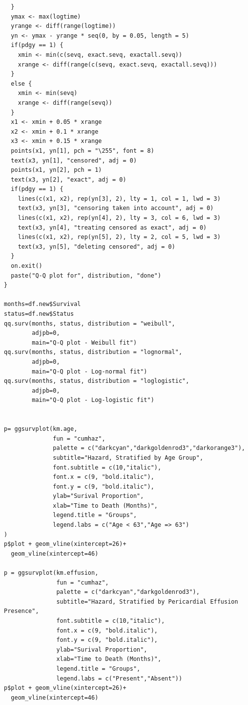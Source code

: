 \documentclass[
]{article}
\begin{document}
\begin{verbatim}
  }
  ymax <- max(logtime)
  yrange <- diff(range(logtime))
  yn <- ymax - yrange * seq(0, by = 0.05, length = 5)
  if(pdgy == 1) {
    xmin <- min(c(sevq, exact.sevq, exactall.sevq))
    xrange <- diff(range(c(sevq, exact.sevq, exactall.sevq)))
  }
  else {
    xmin <- min(sevq)
    xrange <- diff(range(sevq))
  }
  x1 <- xmin + 0.05 * xrange
  x2 <- xmin + 0.1 * xrange
  x3 <- xmin + 0.15 * xrange
  points(x1, yn[1], pch = "\255", font = 8)
  text(x3, yn[1], "censored", adj = 0)
  points(x1, yn[2], pch = 1)
  text(x3, yn[2], "exact", adj = 0)
  if(pdgy == 1) {
    lines(c(x1, x2), rep(yn[3], 2), lty = 1, col = 1, lwd = 3)
    text(x3, yn[3], "censoring taken into account", adj = 0)
    lines(c(x1, x2), rep(yn[4], 2), lty = 3, col = 6, lwd = 3)
    text(x3, yn[4], "treating censored as exact", adj = 0)
    lines(c(x1, x2), rep(yn[5], 2), lty = 2, col = 5, lwd = 3)
    text(x3, yn[5], "deleting censored", adj = 0)
  }
  on.exit()
  paste("Q-Q plot for", distribution, "done")
}

months=df.new$Survival
status=df.new$Status
qq.surv(months, status, distribution = "weibull",
        adjpb=0,
        main="Q-Q plot - Weibull fit")
qq.surv(months, status, distribution = "lognormal",
        adjpb=0,
        main="Q-Q plot - Log-normal fit")
qq.surv(months, status, distribution = "loglogistic",
        adjpb=0,
        main="Q-Q plot - Log-logistic fit")


p= ggsurvplot(km.age, 
              fun = "cumhaz",
              palette = c("darkcyan","darkgoldenrod3","darkorange3"), 
              subtitle="Hazard, Stratified by Age Group",
              font.subtitle = c(10,"italic"),
              font.x = c(9, "bold.italic"),
              font.y = c(9, "bold.italic"),
              ylab="Surival Proportion", 
              xlab="Time to Death (Months)",
              legend.title = "Groups",
              legend.labs = c("Age < 63","Age => 63")
)
p$plot + geom_vline(xintercept=26)+
  geom_vline(xintercept=46)

p = ggsurvplot(km.effusion, 
               fun = "cumhaz",
               palette = c("darkcyan","darkgoldenrod3"), 
               subtitle="Hazard, Stratified by Pericardial Effusion Presence",
               font.subtitle = c(10,"italic"),
               font.x = c(9, "bold.italic"),
               font.y = c(9, "bold.italic"),
               ylab="Surival Proportion", 
               xlab="Time to Death (Months)",
               legend.title = "Groups",
               legend.labs = c("Present","Absent"))
p$plot + geom_vline(xintercept=26)+
  geom_vline(xintercept=46)


\end{verbatim}
\end{document}
